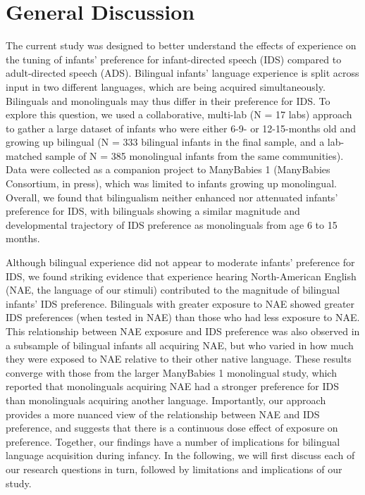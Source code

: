 \documentclass[english,,man,floatsintext]{apa6}
\begin{document}
\hypertarget{general-discussion}{%
\section{General Discussion}\label{general-discussion}}

The current study was designed to better understand the effects of experience on the tuning of infants' preference for infant-directed speech (IDS) compared to adult-directed speech (ADS). Bilingual infants' language experience is split across input in two different languages, which are being acquired simultaneously. Bilinguals and monolinguals may thus differ in their preference for IDS. To explore this question, we used a collaborative, multi-lab (N = 17 labs) approach to gather a large dataset of infants who were either 6-9- or 12-15-months old and growing up bilingual (N = 333 bilingual infants in the final sample, and a lab-matched sample of N = 385 monolingual infants from the same communities). Data were collected as a companion project to ManyBabies 1 (ManyBabies Consortium, in press), which was limited to infants growing up monolingual. Overall, we found that bilingualism neither enhanced nor attenuated infants' preference for IDS, with bilinguals showing a similar magnitude and developmental trajectory of IDS preference as monolinguals from age 6 to 15 months.

Although bilingual experience did not appear to moderate infants' preference for IDS, we found striking evidence that experience hearing North-American English (NAE, the language of our stimuli) contributed to the magnitude of bilingual infants' IDS preference. Bilinguals with greater exposure to NAE showed greater IDS preferences (when tested in NAE) than those who had less exposure to NAE. This relationship between NAE exposure and IDS preference was also observed in a subsample of bilingual infants all acquiring NAE, but who varied in how much they were exposed to NAE relative to their other native language. These results converge with those from the larger ManyBabies 1 monolingual study, which reported that monolinguals acquiring NAE had a stronger preference for IDS than monolinguals acquiring another language. Importantly, our approach provides a more nuanced view of the relationship between NAE and IDS preference, and suggests that there is a continuous dose effect of exposure on preference. Together, our findings have a number of implications for bilingual language acquisition during infancy. In the following, we will first discuss each of our research questions in turn, followed by limitations and implications of our study.
\end{document}
